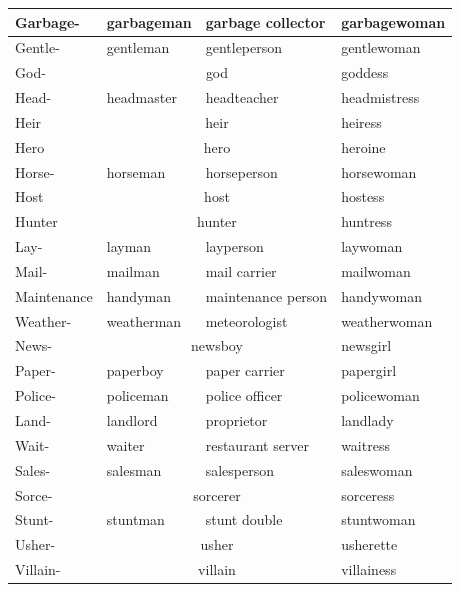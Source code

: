 \documentclass{article}
\begin{document}
\begin{table}[h!]
\begin{tabular}{|l|l|l|l|}
			\hline
			Garbage- & garbageman & garbage collector & garbagewoman \\
			\hline
			Gentle- & gentleman & gentleperson & gentlewoman \\
			\hline
			God- & \multicolumn{2}{c|}{god} & goddess \\
			\hline
			Head- & headmaster & headteacher & headmistress \\
			\hline
			Heir & \multicolumn{2}{c|}{heir} & heiress \\
			\hline 
			Hero & \multicolumn{2}{c|}{hero} & heroine \\
			\hline
			Horse- & horseman & horseperson & horsewoman \\
			\hline
			Host & \multicolumn{2}{c|}{host} & hostess \\
			\hline
			Hunter & \multicolumn{2}{c|}{hunter} & huntress \\
			\hline
			Lay- & layman & layperson & laywoman \\
			\hline
			Mail- & mailman & mail carrier & mailwoman \\
			\hline 
			Maintenance & handyman & maintenance person & handywoman \\
			\hline 
			Weather- & weatherman & meteorologist & weatherwoman \\
			\hline 
			News- & \multicolumn{2}{c|}{newsboy} & newsgirl \\
			\hline
			Paper- & paperboy & paper carrier & papergirl \\
			\hline 
			Police- & policeman & police officer & policewoman \\
			\hline
			Land- & landlord & proprietor & landlady \\
			\hline
			Wait- & waiter & restaurant server & waitress \\
			\hline 
			Sales- & salesman & salesperson & saleswoman \\
			\hline 
			Sorce- & \multicolumn{2}{c|}{sorcerer} & sorceress \\
			\hline
			Stunt- & stuntman & stunt double & stuntwoman \\
			\hline 
			Usher- & \multicolumn{2}{c|}{usher} & usherette \\
			\hline 
			Villain- & \multicolumn{2}{c|}{villain} & villainess \\
			\hline
					
		\end{tabular}
	\end{table}
	
	\newpage
	
\end{document}
